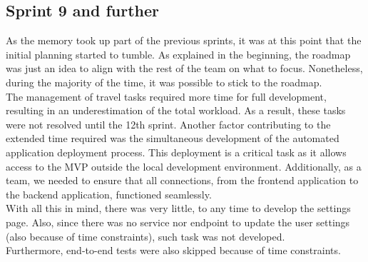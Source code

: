 \documentclass[../memory.tex]{subfiles}
\begin{document}
\subsection{Sprint 9 and further}
As the memory took up part of the previous sprints, it was at this point that
the initial planning started to tumble. As explained in the beginning, the
roadmap was just an idea to align with the rest of the team on what to focus.
Nonetheless, during the majority of the time, it was possible to stick to the
roadmap.
\\[8pt]
The management of travel tasks required more time for full development,
resulting in an underestimation of the total workload. As a result, these tasks
were not resolved until the 12th sprint. Another factor contributing to the
extended time required was the simultaneous development of the automated
application deployment process. This deployment is a critical task as it allows
access to the MVP outside the local development environment. Additionally, as
a team, we needed to ensure that all connections, from the frontend application
to the backend application, functioned seamlessly.
\\[8pt]
With all this in mind, there was very little, to any time to develop the
settings page. Also, since there was no service nor endpoint to update the user
settings (also because of time constraints), such task was not developed.
\\
Furthermore, end-to-end tests were also skipped because of time constraints.
\end{document}
